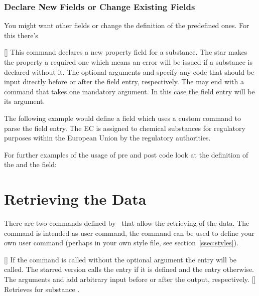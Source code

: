 \documentclass[load-preamble+]{cnltx-doc}
\begin{document}
\subsubsection{Declare New Fields or Change Existing Fields}
You might want other fields or change the definition of the predefined ones.
For this there's
\begin{commands}
  [\sarg{}]
    This command declares a new property field for a substance. The star makes
    the property a required one which means an error will be issued if a
    substance is declared without it. The optional arguments 
    and  specify any code that should be input directly before
    or after the field entry, respectively. The  may end with a
    command that takes one mandatory argument. In this case the field entry
    will be its argument.
\end{commands}

The following example would define a field  which uses a custom
command to parse the field entry. The \ac{EC} is assigned to chemical
substances for regulatory purposes within the European Union by the regulatory
authorities.
For further examples of the usage of pre and post code look at the definition of
the  and the  field:

\section{Retrieving the Data}
There are two commands defined by \substances\ that allow the retrieving of
the data. The command  is intended as user command, the command
 can be used to define your own user command (perhaps
in your own style file, see section~\ref{ssec:styles}).
\begin{commands}
  [\sarg{}]
    If the command  is called without the optional 
    argument the  entry will be called. The starred version calls
    the  entry if it is defined and the  entry
    otherwise. The arguments  and  add arbitrary input
    before or after the output, respectively.
  []
    Retrieves  for substance .
\end{commands}
\end{document}
